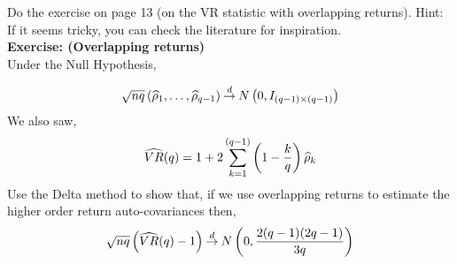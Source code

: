 Do the exercise on page 13 (on the VR statistic with overlapping returns). Hint: If it seems tricky, you can check the literature for inspiration. \\

\textbf{Exercise: (Overlapping returns)} \\

Under the Null Hypothesis,

\[
    \sqrt{nq}\left( \widehat{\rho}_1, \dots, \widehat{\rho}_{q-1} \right) \mathbin{\overset{d}{\to}} N\left( 0,I_{(q-1)\times (q-1)} \right)
\]
We also saw,
\[
    \widehat{VR}{\left( q \right)} = 1+2\sum_{k=1}^{(q-1)} \left( 1-\frac{k}{q} \right)\widehat{\rho}_k
\]
Use the Delta method to show that, if we use overlapping returns to estimate the higher order return auto-covariances then,
\[
    \sqrt{nq}\left( \widehat{VR}{\left( q \right)}-1 \right) \mathbin{\overset{d}{\to}} N\left( 0,\frac{2(q-1)(2q-1)}{3q} \right)
\]